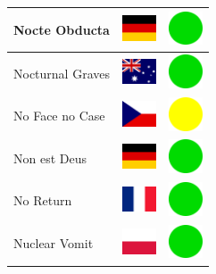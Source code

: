 \documentclass[12pt, a4paper, twoside]{report}
\begin{document}
\begin{center}
\begin{longtable}{|p{5cm}|p{2cm}|p{2cm}|}
 Nocte Obducta                                              & \includegraphics[width=1cm]{../4x3/de} &   \includegraphics[width=1cm]{../likes/y} \\ \hline
 Nocturnal Graves                                           & \includegraphics[width=1cm]{../4x3/au} &   \includegraphics[width=1cm]{../likes/y} \\ \hline
 No Face no Case                                            & \includegraphics[width=1cm]{../4x3/cz} &   \includegraphics[width=1cm]{../likes/m} \\ \hline
 Non est Deus                                               & \includegraphics[width=1cm]{../4x3/de} &   \includegraphics[width=1cm]{../likes/y} \\ \hline
 No Return                                                  & \includegraphics[width=1cm]{../4x3/fr} &   \includegraphics[width=1cm]{../likes/y} \\ \hline
 Nuclear Vomit                                              & \includegraphics[width=1cm]{../4x3/pl} &   \includegraphics[width=1cm]{../likes/y} \\ \hline

\end{longtable}
\end{center}
\end{document}
